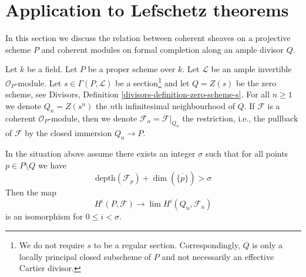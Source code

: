 \section{Application to Lefschetz theorems}
\label{section-lefschetz}

\noindent
In this section we discuss the relation between coherent sheaves on a
projective scheme $P$ and coherent modules on formal completion along
an ample divisor $Q$.

\medskip\noindent
Let $k$ be a field. Let $P$ be a proper scheme over $k$.
Let $\mathcal{L}$ be an ample invertible $\mathcal{O}_P$-module.
Let $s \in \Gamma(P, \mathcal{L})$ be a section\footnote{We do not
require $s$ to be a regular section. Correspondingly, $Q$ is only
a locally principal closed subscheme of $P$ and not necessarily an effective
Cartier divisor.} and let
$Q = Z(s)$ be the zero scheme, see
Divisors, Definition \ref{divisors-definition-zero-scheme-s}.
For all $n \geq 1$ we denote $Q_n = Z(s^n)$
the $n$th infinitesimal neighbourhood of $Q$.
If $\mathcal{F}$ is a coherent $\mathcal{O}_P$-module, then we denote
$\mathcal{F}_n = \mathcal{F}|_{Q_n}$ the restriction, i.e.,
the pullback of $\mathcal{F}$ by the closed immersion
$Q_n \to P$.

\begin{proposition}
\label{proposition-lefschetz}
In the situation above assume there exists an integer $\sigma$ such that
for all points $p \in P \setminus Q$ we have
$$
\text{depth}(\mathcal{F}_p) + \dim(\overline{\{p\}}) > \sigma
$$
Then the map
$$
H^i(P, \mathcal{F}) \longrightarrow \lim H^i(Q_n, \mathcal{F}_n)
$$
is an isomorphism for $0 \leq i < \sigma$.
\end{proposition}

